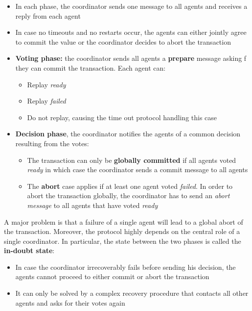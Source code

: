 \begin{itemize}
    \item In each phase, the coordinator sends one message to all agents and receives a reply from each agent
    \item In case no timeouts and no restarts occur, the agents can either jointly agree to commit the value or the coordinator decides to abort the transaction
    \item \textbf{Voting phase:} the coordinator sends all agents a \textbf{prepare} message asking f they can commit the transaction. Each agent can:
    \begin{itemize}
        \item Replay \textit{ready}
        \item Replay \textit{failed}
        \item Do not replay, causing the time out protocol handling this case
    \end{itemize}
    \item \textbf{Decision phase}, the coordinator notifies the agents of a common decision resulting from the votes: 
    \begin{itemize}
        \item The transaction can only be \textbf{globally committed} if all agents voted \textit{ready} in which case the coordinator sends a commit message to all agents
        \item The \textbf{abort} case applies if at least one agent voted \textit{failed}. In order
        to abort the transaction globally, the coordinator has to send an \textit{abort message} to all agents that have voted \textit{ready}
    \end{itemize}
\end{itemize}

\begin{tcolorbox}
A major problem is that a failure of a single agent will lead to a global abort of the transaction. Moreover, the protocol highly depends on the central role of a single coordinator. In particular, the state between the two phases is called the \textbf{in-doubt state}:

\begin{itemize}
    \item In case the coordinator irrecoverably fails before sending his decision, the agents cannot proceed to either commit or abort the transaction
    \item It can only be solved by a complex recovery procedure that contacts all other agents and asks for their votes again
\end{itemize}
\end{tcolorbox}


